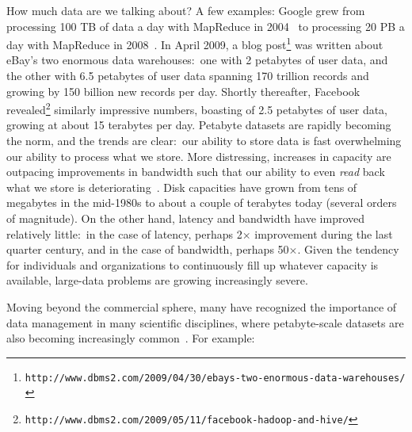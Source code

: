 How much data are we talking about?  A few examples: Google grew from
processing 100 TB of data a day with MapReduce in
2004~\cite{Dean_Ghemawat_OSDI2004} to processing 20 PB a day with
MapReduce in 2008~\cite{Dean_Ghemawat_CACM2008}.  In April 2009, a
blog post\footnote{\texttt{http://www.dbms2.com/2009/04/30/ebays-two-enormous-data-warehouses/}}
was written about eBay's two enormous data warehouses:\ one with 2
petabytes of user data, and the other with 6.5 petabytes of user data
spanning 170 trillion records and growing by 150 billion new records
per day.  Shortly thereafter, Facebook revealed\footnote{\texttt{http://www.dbms2.com/2009/05/11/facebook-hadoop-and-hive/}} similarly
impressive numbers, boasting of 2.5 petabytes of user data, growing at
about 15 terabytes per day.  Petabyte datasets are rapidly becoming
the norm, and the trends are clear:\ our ability to store data is fast
overwhelming our ability to process what we store.  More distressing,
increases in capacity are outpacing improvements in bandwidth such
that our ability to even \emph{read} back what we store is
deteriorating~\cite{Leventhal_2009}.  Disk capacities have grown from
tens of megabytes in the mid-1980s to about a couple of terabytes
today (several orders of magnitude).  On the other hand, latency and
bandwidth have improved relatively little:\ in the case of latency,
perhaps 2$\times$ improvement during the last quarter century, and in
the case of bandwidth, perhaps 50$\times$.  Given the tendency for
individuals and organizations to continuously fill up whatever
capacity is available, large-data problems are growing increasingly
severe.

Moving beyond the commercial sphere, many have recognized the
importance of data management in many scientific disciplines, where
petabyte-scale datasets are also becoming increasingly
common~\cite{Bell_etal_2009}.  For example:

